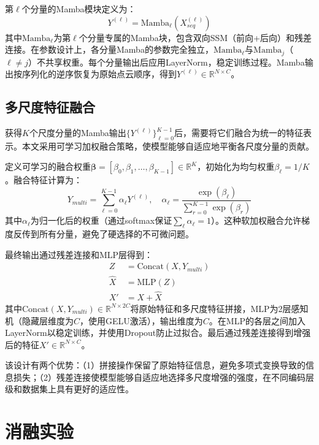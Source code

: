 第$\ell$个分量的Mamba模块定义为：
\begin{equation}
Y^{(\ell)} = \text{Mamba}_\ell(X^{(\ell)}_{seq})
\end{equation}
其中$\text{Mamba}_\ell$为第$\ell$个分量专属的Mamba块，包含双向SSM（前向+后向）和残差连接。在参数设计上，各分量Mamba的参数完全独立，$\text{Mamba}_\ell$与$\text{Mamba}_j$（$\ell \neq j$）不共享权重。每个分量输出后应用LayerNorm，稳定训练过程。Mamba输出按序列化的逆序恢复为原始点云顺序，得到$Y^{(\ell)} \in \mathbb{R}^{N \times C}$。

\subsection{多尺度特征融合}

获得$K$个尺度分量的Mamba输出$\{Y^{(\ell)}\}_{\ell=0}^{K-1}$后，需要将它们融合为统一的特征表示。本文采用可学习加权融合策略，使模型能够自适应地平衡各尺度分量的贡献。

定义可学习的融合权重$\boldsymbol{\beta} = [\beta_0, \beta_1, \ldots, \beta_{K-1}] \in \mathbb{R}^K$，初始化为均匀权重$\beta_\ell = 1/K$。融合特征计算为：
\begin{equation}
Y_{multi} = \sum_{\ell=0}^{K-1} \alpha_\ell Y^{(\ell)}, \quad \alpha_\ell = \frac{\exp(\beta_\ell)}{\sum_{r=0}^{K-1}\exp(\beta_r)}
\end{equation}
其中$\alpha_\ell$为归一化后的权重（通过softmax保证$\sum_\ell \alpha_\ell = 1$）。这种软加权融合允许梯度反传到所有分量，避免了硬选择的不可微问题。

最终输出通过残差连接和MLP层得到：
\begin{equation}
\begin{aligned}
Z &= \text{Concat}(X, Y_{multi}) \\
\hat{X} &= \text{MLP}(Z) \\
X' &= X + \hat{X}
\end{aligned}
\end{equation}
其中$\text{Concat}(X, Y_{multi}) \in \mathbb{R}^{N \times 2C}$将原始特征和多尺度特征拼接，$\text{MLP}$为2层感知机（隐藏层维度为$C$，使用GELU激活），输出维度为$C$。在MLP的各层之间加入LayerNorm以稳定训练，并使用Dropout防止过拟合。最后通过残差连接得到增强后的特征$X' \in \mathbb{R}^{N \times C}$。

该设计有两个优势：（1）拼接操作保留了原始特征信息，避免多项式变换导致的信息损失；（2）残差连接使模型能够自适应地选择多尺度增强的强度，在不同编码层级和数据集上具有更好的适应性。

\section{消融实验}

